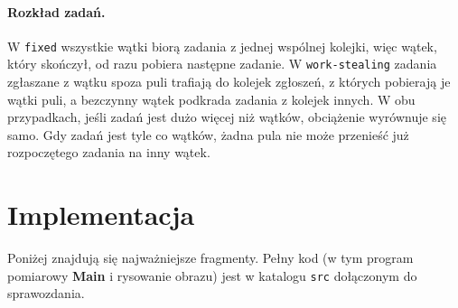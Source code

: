 \documentclass[11pt,a4paper]{article}
\begin{document}
\paragraph{Rozkład zadań.} W \texttt{fixed} wszystkie wątki biorą zadania z jednej wspólnej kolejki,
więc wątek, który skończył, od razu pobiera następne zadanie. W \texttt{work-stealing} zadania
zgłaszane z wątku spoza puli trafiają do kolejek zgłoszeń, z których pobierają je wątki puli,
a bezczynny wątek podkrada zadania z kolejek innych. W obu przypadkach, jeśli zadań jest
dużo więcej niż wątków, obciążenie wyrównuje się samo. Gdy zadań jest tyle co wątków, żadna pula
nie może przenieść już rozpoczętego zadania na inny wątek.

\section{Implementacja}
Poniżej znajdują się najważniejsze fragmenty. Pełny kod (w tym program pomiarowy \textbf{Main}
i rysowanie obrazu) jest w katalogu \texttt{src} dołączonym do sprawozdania.
\end{document}
